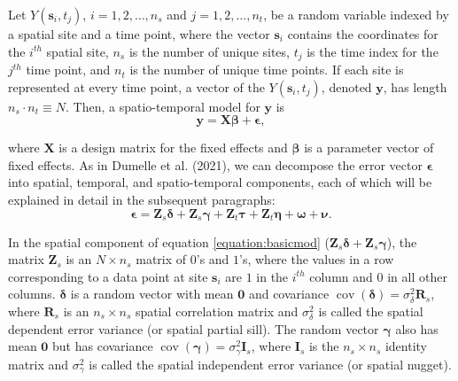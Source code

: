 \documentclass[]{article}    %
\begin{document}
Let \(Y(\mathbf{s}_{i}, t_j)\), \(i = 1, 2, \ldots, n_{s}\) and
\(j = 1, 2, \ldots, n_{t}\), be a random variable indexed by a spatial
site and a time point, where the vector \(\mathbf{s}_i\) contains the
coordinates for the \(i^{th}\) spatial site, \(n_s\) is the number of
unique sites, \(t_j\) is the time index for the \(j^{th}\) time point,
and \(n_t\) is the number of unique time points. If each site is
represented at every time point, a vector of the
\(Y(\mathbf{s}_{i}, t_j)\), denoted \(\mathbf{y}\), has length
\(n_{s} \cdot n_{t} \equiv N\). Then, a spatio-temporal model for
\(\mathbf{y}\) is \mbox{} \begin{equation}
\mathbf{y} = \mathbf{X} \bm{\beta} + \bm{\epsilon},
\end{equation}

\noindent where \(\mathbf{X}\) is a design matrix for the fixed effects
and \(\bm{\beta}\) is a parameter vector of fixed effects. As in Dumelle
et al. (2021), we can decompose the error vector \(\bm{\epsilon}\) into
spatial, temporal, and spatio-temporal components, each of which will be
explained in detail in the subsequent paragraphs: \mbox{}
\begin{equation} \label{equation:basicmod}
\bm{\epsilon} = \mathbf{Z}_{s} \bm{\delta} + \mathbf{Z}_{s} \bm{\gamma} + \mathbf{Z}_t \bm{\tau} + \mathbf{Z}_t \bm{\eta} + \bm{\omega} + \bm{\nu}.
\end{equation}

In the spatial component of equation \ref{equation:basicmod}
(\(\mathbf{Z}_{s} \bm{\delta} + \mathbf{Z}_{s} \bm{\gamma}\)), the
matrix \(\mathbf{Z}_{s}\) is an \(N \times n_s\) matrix of \(0\)'s and
\(1\)'s, where the values in a row corresponding to a data point at site
\(\mathbf{s}_{i}\) are \(1\) in the \(i^{th}\) column and \(0\) in all
other columns. \(\bm{\delta}\) is a random vector with mean
\(\mathbf{0}\) and covariance
\(\mathop{\mathrm{{cov}}}(\bm{\delta}) = \sigma^2_{\delta} \mathbf{R}_{s}\),
where \(\mathbf{R}_s\) is an \(n_s \times n_s\) spatial correlation
matrix and \(\sigma^2_{\delta}\) is called the spatial dependent error
variance (or spatial partial sill). The random vector \(\bm{\gamma}\)
also has mean \(\mathbf{0}\) but has covariance
\(\mathop{\mathrm{{cov}}}(\bm{\gamma}) = \sigma^2_{\gamma} \mathbf{I}_{s}\),
where \(\mathbf{I}_s\) is the \(n_s \times n_s\) identity matrix and
\(\sigma^2_{\gamma}\) is called the spatial independent error variance
(or spatial nugget).
\end{document}
